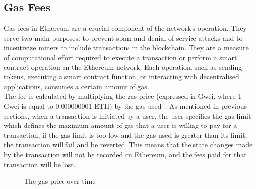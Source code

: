 \subsection{Gas Fees}
Gas fees in Ethereum are a crucial component of the network's operation. They serve two main purposes: to prevent spam and denial-of-service attacks and to incentivize miners to include transactions in the blockchain. They are a measure of computational effort required to execute a transaction or perform a smart contract operation on the Ethereum network. Each operation, such as sending tokens, executing a smart contract function, or interacting with decentralised applications, consumes a certain amount of gas.
\\[3mm]
The fee is calculated by multiplying the gas price (expressed in Gwei, where 1 Gwei is equal to 0.000000001 ETH) by the gas used~\cite{noauthor_gas_nodate}. As mentioned in previous sections, when a transaction is initiated by a user, the user specifies the gas limit which defines the maximum amount of gas that a user is willing to pay for a transaction, if the gas limit is too low and the gas used is greater than its limit, the transaction will fail and be reverted. This means that the state changes made by the transaction will not be recorded on Ethereum, and the fees paid for that transaction will be lost.

\begin{figure}[!htb]
    \centering
    \caption{The gas price over time}
    \label{fig:gwei_over_time}
\end{figure}

